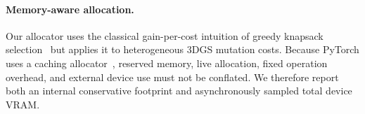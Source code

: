 \begin{table}[t]
\centering\scriptsize
\caption{Positioning relative to representative efficiency work. ``Peak feedback'' denotes live allocator-state control during densification.}
\label{tab:related}
\end{table}

\paragraph{Memory-aware allocation.}
Our allocator uses the classical gain-per-cost intuition of greedy knapsack selection~\cite{martello1990knapsack} but applies it to heterogeneous 3DGS mutation costs. Because PyTorch uses a caching allocator~\cite{paszke2019pytorch}, reserved memory, live allocation, fixed operation overhead, and external device use must not be conflated. We therefore report both an internal conservative footprint and asynchronously sampled total device VRAM.
